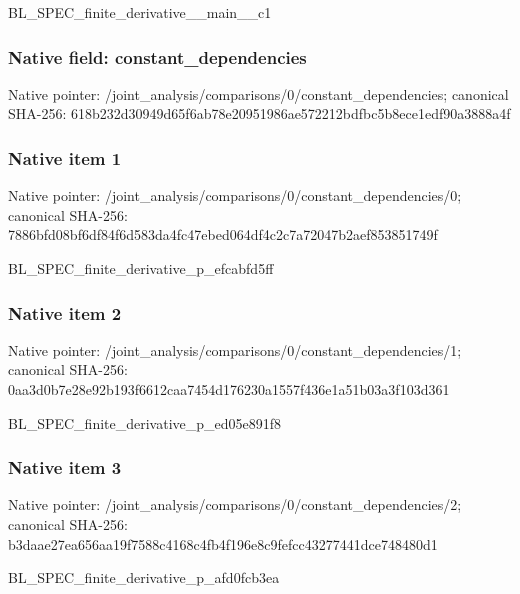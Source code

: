 \documentclass[10pt,a4paper]{article}
\begin{document}
\begingroup\raggedright\sloppy BL\_\allowbreak{}SPEC\_\allowbreak{}finite\_\allowbreak{}derivative\_\allowbreak{}\_\allowbreak{}main\_\allowbreak{}\_\allowbreak{}c1\par\endgroup

\subsubsection{Native field: constant\_\allowbreak{}dependencies}
Native pointer: /joint\_\allowbreak{}analysis/comparisons/0/constant\_\allowbreak{}dependencies; canonical SHA-256: 618b232d30949d65f6ab78e20951986ae572212bdfbc5b8ece1edf90a3888a4f

\subsubsection{Native item 1}
Native pointer: /joint\_\allowbreak{}analysis/comparisons/0/constant\_\allowbreak{}dependencies/0; canonical SHA-256: 7886bfd08bf6df84f6d583da4fc47ebed064df4c2c7a72047b2aef853851749f

\begingroup\raggedright\sloppy BL\_\allowbreak{}SPEC\_\allowbreak{}finite\_\allowbreak{}derivative\_\allowbreak{}p\_\allowbreak{}efcabfd5ff\par\endgroup

\subsubsection{Native item 2}
Native pointer: /joint\_\allowbreak{}analysis/comparisons/0/constant\_\allowbreak{}dependencies/1; canonical SHA-256: 0aa3d0b7e28e92b193f6612caa7454d176230a1557f436e1a51b03a3f103d361

\begingroup\raggedright\sloppy BL\_\allowbreak{}SPEC\_\allowbreak{}finite\_\allowbreak{}derivative\_\allowbreak{}p\_\allowbreak{}ed05e891f8\par\endgroup

\subsubsection{Native item 3}
Native pointer: /joint\_\allowbreak{}analysis/comparisons/0/constant\_\allowbreak{}dependencies/2; canonical SHA-256: b3daae27ea656aa19f7588c4168c4fb4f196e8c9fefcc43277441dce748480d1

\begingroup\raggedright\sloppy BL\_\allowbreak{}SPEC\_\allowbreak{}finite\_\allowbreak{}derivative\_\allowbreak{}p\_\allowbreak{}afd0fcb3ea\par\endgroup
\end{document}
